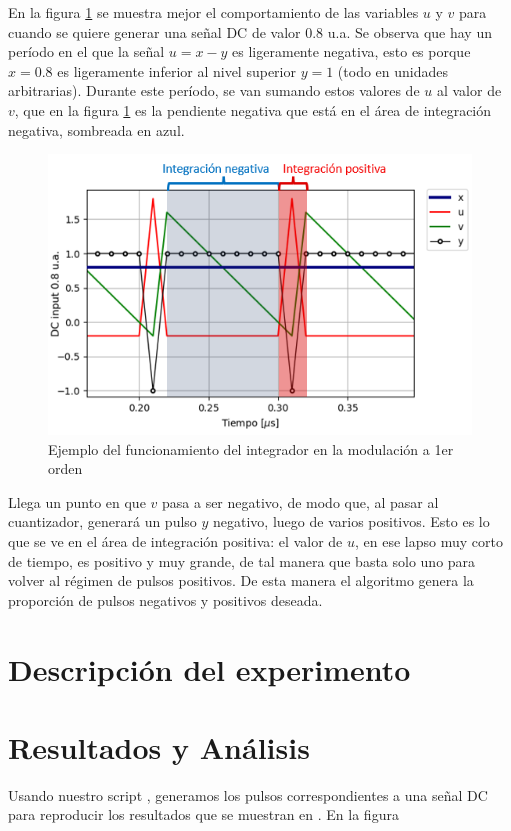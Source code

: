 \documentclass[twoside]{article}
\begin{document}
\begin{multicols}{2}
En la figura \ref{fig:integrador} se muestra mejor el comportamiento de las variables $u$ y $v$ para cuando se quiere generar una señal DC de valor 0.8 u.a. Se observa que hay un período en el que la señal $u=x-y$ es ligeramente negativa, esto es porque $x=0.8$ es ligeramente inferior al nivel superior $y=1$ (todo en unidades arbitrarias). Durante este período, se van sumando estos valores de $u$ al valor de $v$, que en la figura \ref{fig:integrador} es la pendiente negativa que está en el área de integración negativa, sombreada en azul.


\begin{figure}[H]
\centering
\includegraphics[width=\linewidth]{figuras/integracion.png}
\caption{Ejemplo del funcionamiento del integrador en la modulación a 1er orden}
\label{fig:integrador}
\end{figure}

Llega un punto en que $v$ pasa a ser negativo, de modo que, al pasar al cuantizador, generará un pulso $y$ negativo, luego de varios positivos. Esto es lo que se ve en el área de integración positiva: el valor de $u$, en ese lapso muy corto de tiempo, es positivo y muy grande, de tal manera que basta solo uno para volver al régimen de pulsos positivos. De esta manera el algoritmo genera la proporción de pulsos negativos y positivos deseada.

\section{Descripción del experimento}

\section{Resultados y Análisis}

Usando nuestro script \cite{script}, generamos los pulsos correspondientes a una señal DC para reproducir los resultados que se muestran en \cite{aziz1996}. En la figura 

\end{multicols}





\nocite{*} %
\end{document}
